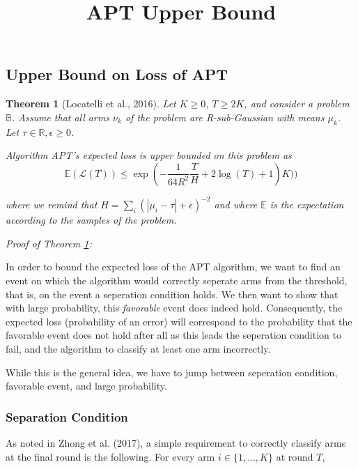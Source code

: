 \documentclass[12pt,]{article}
\title{APT Upper Bound}
\author{}
\date{}
\newtheorem{theorem}{Theorem}
\begin{document}
\maketitle

{
\hypersetup{linkcolor=black}
\setcounter{tocdepth}{3}
\tableofcontents
}
\subsection{Upper Bound on Loss of
APT}\label{upper-bound-on-loss-of-apt}

\begin{theorem}[Locatelli et al., 2016] \label{theorem:LocatelliTheorem4}
Let $K \geq 0$, $T \geq 2K$, and consider a problem $\mathbb{B}$. Assume that
all arms $\nu_k$ of the problem are R-sub-Gaussian with means $\mu_k$. Let $\tau
\in \mathbb{R}, \epsilon \geq 0$.

Algorithm APT's expected loss is upper bounded on this problem as 
\begin{equation*} \mathbb{E}(\mathcal{L}(T)) \leq \exp
(-\frac{1}{64R^2}\frac{T}{H} + 2 \log (T) + 1)K)) \end{equation*}

where we remind that $H = \sum_i (|\mu_i - \tau | + \epsilon)^{-2}$ and where
$\mathbb{E}$ is the expectation according to the samples of the problem.
\end{theorem}

\emph{Proof of Theorem \ref{theorem:LocatelliTheorem4}:}

In order to bound the expected loss of the APT algorithm, we want to
find an event on which the algorithm would correctly seperate arms from
the threshold, that is, on the event a seperation condition holds. We
then want to show that with large probability, this \emph{favorable}
event does indeed hold. Consequently, the expected loss (probability of
an error) will correspond to the probability that the favorable event
does not hold after all as this leads the seperation condition to fail,
and the algorithm to classify at least one arm incorrectly.

While this is the general idea, we have to jump between seperation
condition, favorable event, and large probability.

\subsubsection{Separation Condition}\label{separation-condition}

As noted in Zhong et al. (2017), a simple requirement to correctly
classify arms at the final round is the following. For every arm
\(i \in \{1, ..., K\}\) at round \(T\),
\end{document}
